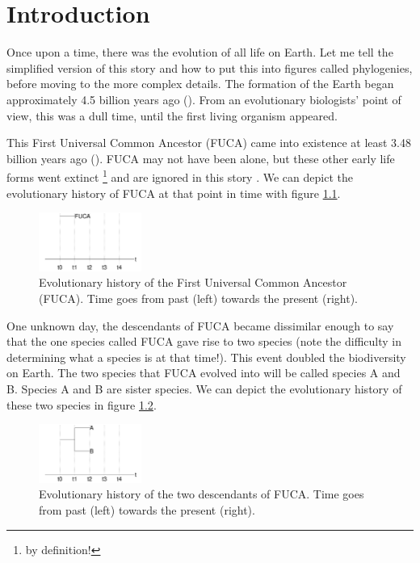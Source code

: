   \chapter{Introduction}
\label{chapter_introduction}
\newpage

\noindent

Once upon a time, there was the evolution of all life on
Earth. Let me tell the simplified version of this story and how
to put this into figures called phylogenies, before moving to the
more complex details. 
The formation of the Earth began approximately 4.5 billion years 
ago (\cite{dalrymple2001age}).
From an evolutionary biologists' point of view, 
this was a dull time,
until the first living organism appeared.

This First Universal Common Ancestor (FUCA) came into existence at least 
3.48 billion years ago (\cite{noffke2013microbially}). 
FUCA may not have been alone, but these other early life forms went extinct 
\footnote{by definition!} and are ignored in this story .
We can depict the evolutionary history of FUCA at that point in time
with figure \ref{fig:t_0}.

\begin{figure}[H]
  \includegraphics[width=0.3\textwidth]{t_0.png}
  \caption{
    Evolutionary history of the First Universal Common Ancestor (FUCA).
    Time goes from past (left) towards the present (right).
  }
  \label{fig:t_0}
\end{figure}

One unknown day, the descendants of FUCA became
dissimilar enough to say that the one species called FUCA 
gave rise to two species (note the difficulty in determining what 
a species is at that time!).
This event doubled the biodiversity on Earth.
The two species that FUCA evolved into will be called species A and B. Species A and B are sister species. 
We can depict the evolutionary
history of these two species in figure \ref{fig:t_1}.

\begin{figure}[H]
  \includegraphics[width=0.3\textwidth]{t_1.png}
  \caption{
    Evolutionary history of the two descendants of FUCA.
    Time goes from past (left) towards the present (right).
  }
  \label{fig:t_1}
\end{figure}

